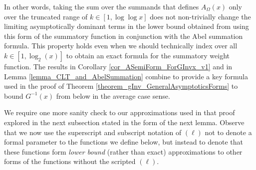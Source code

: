 \documentclass[11pt,reqno,a4letter]{article}
\numberwithin{figure}{section}
\numberwithin{table}{section}
\theoremstyle{plain}
\numberwithin{theorem}{section}
\theoremstyle{definition}
\begin{document}
In other words, taking the sum over the summands that defines $A_{\Omega}(x)$ only over the truncated range of 
$k \in [1, \log\log x]$ does not non-trivially change the limiting asymptotically 
dominant terms in the lower bound obtained from using this form of the summatory function in 
conjunction with the Abel summation formula. This property holds even when we should technically 
index over all $k \in [1, \log_2(x)]$ to obtain an exact formula for the summatory weight function. 
The results in Corollary \ref{cor_ASemiForm_ForGInvx_v1} and in 
Lemma \ref{lemma_CLT_and_AbelSummation} combine to provide a key formula used in the 
proof of Theorem \ref{theorem_gInv_GeneralAsymptoticsForms} to bound $G^{-1}(x)$ from 
below in the average case sense. 

We require one more sanity check to our approximations 
used in that proof explored in the next subsection stated in the form of the next lemma. 
Observe that we now use the superscript and subscript notation of 
$(\ell)$ not to denote a formal parameter to 
the functions we define below, but instead to denote that these functions form 
\emph{lower bound} (rather than exact) 
approximations to other forms of the functions without the scripted $(\ell)$. 
\end{document}

